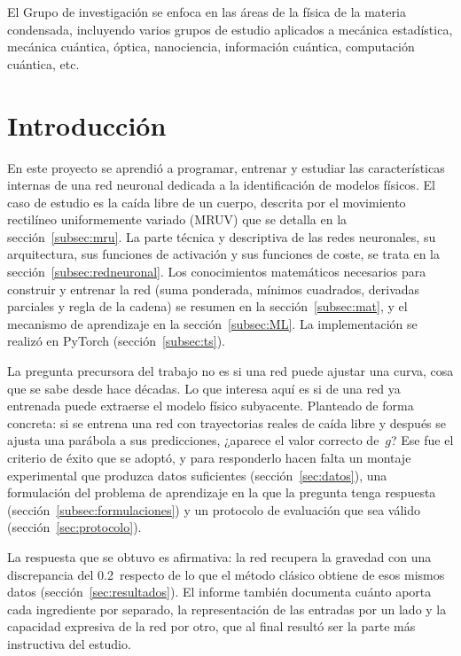 \documentclass[titlepage,11pt]{article}
\providecommand{\SI}[2]{#1\,#2}
\providecommand{\percent}{\char37\relax}
\begin{document}
El Grupo de investigación se enfoca en las áreas de la física de la materia
condensada, incluyendo varios grupos de estudio aplicados a mecánica
estadística, mecánica cuántica, óptica, nanociencia, información cuántica,
computación cuántica, etc.


\section{Introducción}
\label{sec:introduccion}
En este proyecto se aprendió a programar, entrenar y estudiar las
características internas de una red neuronal dedicada a la identificación de
modelos físicos. El caso de estudio es la caída libre de un cuerpo, descrita
por el movimiento rectilíneo uniformemente variado (MRUV) que se detalla en la
sección~\ref{subsec:mru}. La parte técnica y descriptiva de las redes
neuronales, su arquitectura, sus funciones de activación y sus funciones de
coste, se trata en la sección~\ref{subsec:redneuronal}. Los conocimientos
matemáticos necesarios para construir y entrenar la red (suma ponderada,
mínimos cuadrados, derivadas parciales y regla de la cadena) se resumen en la
sección~\ref{subsec:mat}, y el mecanismo de aprendizaje en la
sección~\ref{subsec:ML}. La implementación se realizó en PyTorch
(sección~\ref{subsec:ts}).

La pregunta precursora del trabajo no es si una red puede ajustar una curva,
cosa que se sabe desde hace décadas. Lo que interesa aquí es si de una red ya
entrenada puede extraerse el modelo físico subyacente. Planteado de forma
concreta: si se entrena una red con trayectorias reales de caída libre y
después se ajusta una parábola a sus predicciones, ¿aparece el valor correcto
de~$g$? Ese fue el criterio de éxito que se adoptó, y para responderlo hacen
falta un montaje experimental que produzca datos suficientes
(sección~\ref{sec:datos}), una formulación del problema de aprendizaje en la
que la pregunta tenga respuesta (sección~\ref{subsec:formulaciones}) y un
protocolo de evaluación que sea válido (sección~\ref{sec:protocolo}).

La respuesta que se obtuvo es afirmativa: la red recupera la gravedad con una
discrepancia del \SI{0.2}{\percent} respecto de lo que el método clásico
obtiene de esos mismos datos (sección~\ref{sec:resultados}). El informe también
documenta cuánto aporta cada ingrediente por separado, la representación de las
entradas por un lado y la capacidad expresiva de la red por otro, que al final resultó ser la parte más instructiva del estudio.
\end{document}
